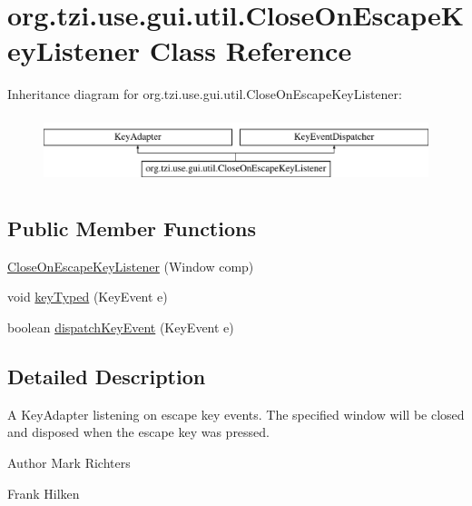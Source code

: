 \hypertarget{classorg_1_1tzi_1_1use_1_1gui_1_1util_1_1_close_on_escape_key_listener}{\section{org.\-tzi.\-use.\-gui.\-util.\-Close\-On\-Escape\-Key\-Listener Class Reference}
\label{classorg_1_1tzi_1_1use_1_1gui_1_1util_1_1_close_on_escape_key_listener}
}
Inheritance diagram for org.\-tzi.\-use.\-gui.\-util.\-Close\-On\-Escape\-Key\-Listener\-:\begin{figure}[H]
\begin{center}
\leavevmode
\includegraphics[height=1.985816cm]{classorg_1_1tzi_1_1use_1_1gui_1_1util_1_1_close_on_escape_key_listener}
\end{center}
\end{figure}
\subsection*{Public Member Functions}
\begin{DoxyCompactItemize}
\item 
\hyperlink{classorg_1_1tzi_1_1use_1_1gui_1_1util_1_1_close_on_escape_key_listener_a7ad4d179d19287d4c567c40863ee9e78}{Close\-On\-Escape\-Key\-Listener} (Window comp)
\item 
void \hyperlink{classorg_1_1tzi_1_1use_1_1gui_1_1util_1_1_close_on_escape_key_listener_ae6a5090524e28c634edd556ce0c21a34}{key\-Typed} (Key\-Event e)
\item 
boolean \hyperlink{classorg_1_1tzi_1_1use_1_1gui_1_1util_1_1_close_on_escape_key_listener_af0f1f8f3021afc7b3734c30c8a90a2ac}{dispatch\-Key\-Event} (Key\-Event e)
\end{DoxyCompactItemize}


\subsection{Detailed Description}
A Key\-Adapter listening on escape key events. The specified window will be closed and disposed when the escape key was pressed.

\begin{DoxyAuthor}{Author}
Mark Richters 

Frank Hilken 
\end{DoxyAuthor}


